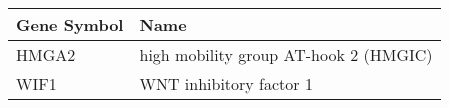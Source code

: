 \begin{tabular}{ll}
\toprule
Gene Symbol &                                  Name \\
\midrule
      HMGA2 & high mobility group AT-hook 2 (HMGIC) \\
       WIF1 &               WNT inhibitory factor 1 \\
\bottomrule
\end{tabular}
